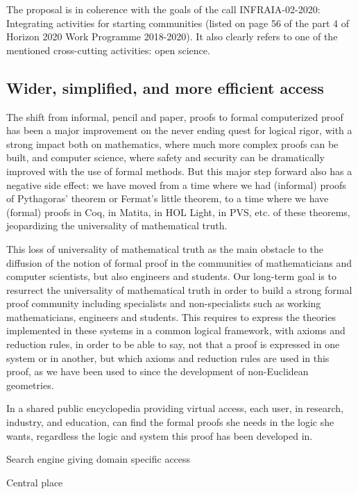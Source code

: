 The proposal is in coherence with the goals of the call INFRAIA-02-2020:
Integrating activities for starting communities (listed on page 56 of
the part 4 of Horizon 2020 Work Programme 2018-2020). It also clearly
refers to one of the mentioned cross-cutting activities: open science.

\subsection{Wider, simplified, and more efficient access}

The shift from informal, pencil and paper, proofs to formal
computerized proof has been a major improvement on the never ending
quest for logical rigor, with a strong impact both on mathematics,
where much more complex proofs can be built, and computer science,
where safety and security can be dramatically improved with the use of
formal methods.  But this major step forward also has a negative side
effect: we have moved from a time where we had (informal) proofs of
Pythagoras' theorem or Fermat's little theorem, to a time where we
have (formal) proofs in {\sc Coq}, in {\sc Matita}, in {\sc HOL
  Light}, in {\sc PVS}, etc.  of these theorems, jeopardizing the
universality of mathematical truth.

This loss of universality of mathematical truth as the main obstacle
to the diffusion of the notion of formal proof in the communities of
mathematicians and computer scientists, but also engineers and
students. Our long-term goal is to resurrect the universality of
mathematical truth in order to build a strong formal proof community
including specialists and non-specialists such as working
mathematicians, engineers and students.  This requires to express the
theories implemented in these systems in a common logical framework,
with axioms and reduction rules, in order to be able to say, not that
a proof is expressed in one system or in another, but which axioms and
reduction rules are used in this proof, as we have been used to since
the development of non-Euclidean geometries.

In a shared public encyclopedia providing virtual access, each user,
in research, industry, and education, can find the formal proofs she
needs in the logic she wants, regardless the logic and system this
proof has been developed in.




{\color{red} Search engine} giving domain specific access


Central place

